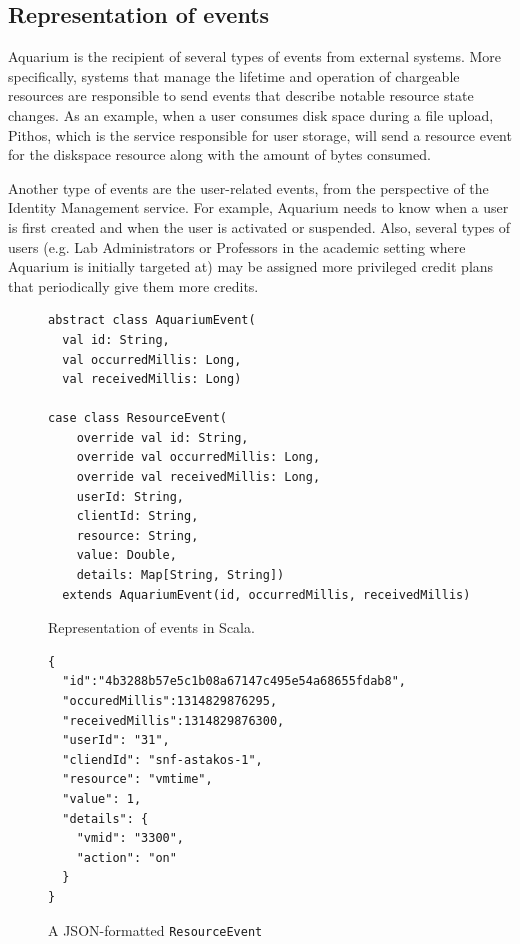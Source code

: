 \documentclass[preprint,10pt]{sigplanconf}
\begin{document}
\subsection{Representation of events}
Aquarium is the recipient of several types of events from external systems. More specifically, systems that manage the lifetime and operation of chargeable resources are responsible to send events that describe notable resource state changes. As an example, when a user consumes disk space during a file upload, Pithos, which is the service responsible for user storage, will send a resource event for the \textsf{diskspace} resource along with the amount of bytes consumed.

Another type of events are the user-related events, from the perspective of the Identity Management service. For example, Aquarium needs to know when a user is first created and when the user is activated or suspended. Also, several types of users (e.g. Lab Administrators or Professors in the academic setting where Aquarium is initially targeted at) may be assigned more privileged credit plans that periodically give them more credits.

\begin{figure}
\lstset{language=c, basicstyle=\footnotesize,
stringstyle=\ttfamily, 
flexiblecolumns=true, aboveskip=-0.9em, belowskip=0em, lineskip=0em}

\begin{lstlisting}
abstract class AquariumEvent(
  val id: String,
  val occurredMillis: Long,
  val receivedMillis: Long)
  
case class ResourceEvent(
    override val id: String,
    override val occurredMillis: Long, 
    override val receivedMillis: Long, 
    userId: String,
    clientId: String,               
    resource: String,
    value: Double,
    details: Map[String, String])
  extends AquariumEvent(id, occurredMillis, receivedMillis)
\end{lstlisting}
\caption{Representation of events in Scala.}
\label{fig:aqevent}
\end{figure}

\begin{figure}
\lstset{language=C, basicstyle=\footnotesize,
stringstyle=\ttfamily, 
flexiblecolumns=true, aboveskip=-0.9em, belowskip=0em, lineskip=0em}

\begin{lstlisting}
{
  "id":"4b3288b57e5c1b08a67147c495e54a68655fdab8",
  "occuredMillis":1314829876295,
  "receivedMillis":1314829876300,
  "userId": "31",
  "cliendId": "snf-astakos-1",
  "resource": "vmtime",
  "value": 1,
  "details": {
    "vmid": "3300",
    "action": "on"
  }
}
\end{lstlisting}
\caption{A JSON-formatted \texttt{ResourceEvent}} 
\label{fig:resevt}
\end{figure}
\end{document}
